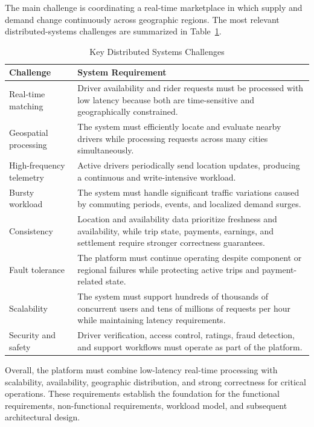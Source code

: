 The main challenge is coordinating a real-time marketplace in which supply and demand change continuously across geographic regions. The most relevant distributed-systems challenges are summarized in Table~\ref{tab:distributed-challenges}.

\begin{table}[H]
\centering
\caption{Key Distributed Systems Challenges}
\label{tab:distributed-challenges}
\begin{tabular}{|p{}|p{}|}
\hline
\textbf{Challenge} & \textbf{System Requirement} \\ \hline

Real-time matching &
Driver availability and rider requests must be processed with low latency because both are time-sensitive and geographically constrained. \\ \hline

Geospatial processing &
The system must efficiently locate and evaluate nearby drivers while processing requests across many cities simultaneously. \\ \hline

High-frequency telemetry &
Active drivers periodically send location updates, producing a continuous and write-intensive workload. \\ \hline

Bursty workload &
The system must handle significant traffic variations caused by commuting periods, events, and localized demand surges. \\ \hline

Consistency &
Location and availability data prioritize freshness and availability, while trip state, payments, earnings, and settlement require stronger correctness guarantees. \\ \hline

Fault tolerance &
The platform must continue operating despite component or regional failures while protecting active trips and payment-related state. \\ \hline

Scalability &
The system must support hundreds of thousands of concurrent users and tens of millions of requests per hour while maintaining latency requirements. \\ \hline

Security and safety &
Driver verification, access control, ratings, fraud detection, and support workflows must operate as part of the platform. \\ \hline

\end{tabular}
\end{table}

Overall, the platform must combine low-latency real-time processing with scalability, availability, geographic distribution, and strong correctness for critical operations. These requirements establish the foundation for the functional requirements, non-functional requirements, workload model, and subsequent architectural design.
